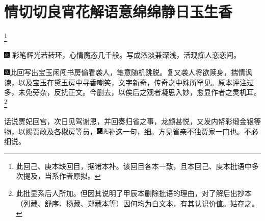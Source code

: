 

\chapter{情切切良宵花解语\hspace{.5em}意绵绵静日玉生香}\footnote{此回己、庚本缺回目，据诸本补。该回目各本一致，且本回己、庚本批语中多次提及，当系作者原拟。}

{\includegraphics[width=3mm]{../Images/00005}  \kaishu 彩笔辉光若转环，心情魔态几千般。写成浓淡兼深浅，活现痴人恋恋间。}

{\includegraphics[width=3mm]{../Images/00009}此回写出宝玉闲闯书房偷看袭人，笔意随机跳脱。复又袭人将欲赎身，揣情讽谏，以及宝玉在黛玉房中寻香嘲笑，文字新奇，传奇之中殊所罕见。原本评注过多，未免旁杂，反扰正文。今删去，以俟后之观者凝思入妙，愈显作者之灵机耳。}\footnote{此批显系后人所加。但因其说明了甲辰本删除批语的理由，对了解后出抄本（列藏、舒序、杨藏、郑藏本等）因何均为白文本，有其认识价值。姑存之。}

话说贾妃回宫，次日见驾谢恩，并回奏归省之事，龙颜甚悦，又发内帑彩缎金银等物，以赐贾政及各椒房等员，{\includegraphics[width=3mm]{../Images/00003}\includegraphics[width=3mm]{../Images/00012}\footnotesize \kaishu 补这一句，细。方见省亲不独贾家一门也。}不必细说。

